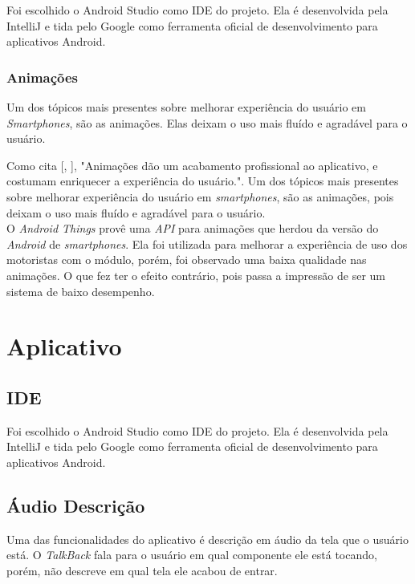 \documentclass[
	12pt,				%
	oneside,			%
	a4paper,			%
	brazil				%
]{abntex2}
\newcommand{\citecustom}[1]{[\citeauthoronline{#1}, \citeyear{#1}]}
\begin{document}
{Foi escolhido o Android Studio como IDE do projeto. Ela é desenvolvida pela IntelliJ e tida pelo Google como ferramenta oficial de desenvolvimento para aplicativos Android.

\subsubsection{Animações}

Um dos tópicos mais presentes sobre melhorar experiência do usuário em \textit{Smartphones}, são as animações. Elas deixam o uso mais fluído e agradável para o usuário. 

Como cita \citecustom{Lecheta2015}, "Animações dão um acabamento profissional ao aplicativo, e costumam enriquecer a experiência do usuário.". Um dos tópicos mais presentes sobre melhorar experiência do usuário em \textit{smartphones}, são as animações, pois deixam o uso mais fluído e agradável para o usuário. \\

O \textit{Android Things} provê uma \textit{API} para animações que herdou da versão do \textit{Android} de \textit{smartphones}. Ela foi utilizada para melhorar a experiência de uso dos motoristas com o módulo, porém, foi observado uma baixa qualidade nas animações. O que fez ter o efeito contrário, pois passa a impressão de ser um sistema de baixo desempenho.\\

\newpage

\section{Aplicativo}

\subsection{IDE}

Foi escolhido o Android Studio como IDE do projeto. Ela é desenvolvida pela IntelliJ e tida pelo Google como ferramenta oficial de desenvolvimento para aplicativos Android.

\subsection{Áudio Descrição}

Uma das funcionalidades do aplicativo é descrição em áudio da tela que o usuário está. O \textit{TalkBack} fala para o usuário em qual componente ele está tocando, porém, não descreve em qual tela ele acabou de entrar. 

}
\end{document}
